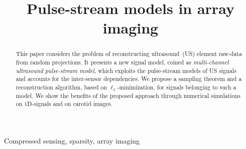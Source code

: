 \documentclass{article}
\theoremstyle{definition}
\begin{document}
\ninept
%
\title{Pulse-stream models in array imaging}
%
%

\maketitle

\begin{abstract}
	This paper considers the problem of reconstructing ultrasound~(US) element raw-data from random projections. It presents a new signal model, coined as \textit{multi-channel ultrasound pulse-stream model}, which exploits the pulse-stream models of US signals and accounts for the inter-sensor dependencies. We propose a sampling theorem and a reconstruction algorithm, based on $\ell_1$-minimization, for signals belonging to such a model. We show the benefits of the proposed approach through numerical simulations on \num{1}D-signals and on  carotid images. 
\end{abstract}

\begin{keywords}
Compressed sensing, sparsity, array imaging
\end{keywords}






%
\maketitle
\end{document}
